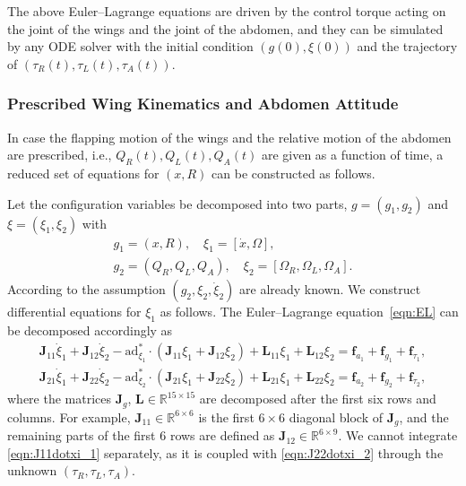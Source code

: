 \documentclass[10pt]{article}
\renewcommand{\Re}{\ensuremath{\mathbb{R}}}
\newcommand{\ad}{\ensuremath{\mathrm{ad}}}
\begin{document}
The above Euler--Lagrange equations are driven by the control torque acting on the joint of the wings and the joint of the abdomen, 
and they can be simulated by any ODE solver with the initial condition $(g(0),\xi(0))$ and the trajectory of $(\tau_R(t),\tau_L(t),\tau_A(t))$. 

\subsubsection{Prescribed Wing Kinematics and Abdomen Attitude}

In case the flapping motion of the wings and the relative motion of the abdomen are prescribed, i.e., $Q_R(t), Q_L(t), Q_A(t)$ are given as a function of time, a reduced set of equations for $(x,R)$ can be constructed as follows. 

Let the configuration variables be decomposed into two parts, $g=(g_1,g_2)$ and $\xi=(\xi_1,\xi_2)$ with
\begin{gather}
    g_1 = (x, R), \quad \xi_1 = [\dot x, \Omega], \label{eqn:g1xi1}\\
    g_2 = (Q_R, Q_L, Q_A), \quad \xi_2 = [\Omega_R, \Omega_L, \Omega_A].\label{eqn:g2xi2}
\end{gather}
According to the assumption $(g_2,\xi_2,\dot\xi_2)$ are already known. 
We construct differential equations for $\xi_1$ as follows. 
The Euler--Lagrange equation~\eqref{eqn:EL} can be decomposed accordingly as
\begin{align}
    \mathbf{J}_{11}\dot \xi_1 + \mathbf{J}_{12}\dot\xi_2 -\ad^*_{\xi_1}\cdot(\mathbf{J}_{11}\xi_1 + \mathbf{J}_{12}\xi_2) + \mathbf{L}_{11}\xi_1 + \mathbf{L}_{12}\xi_2 = \mathbf{f}_{a_1} + \mathbf{f}_{g_1} + \mathbf{f}_{\tau_1},\label{eqn:J11dotxi_1}\\
    \mathbf{J}_{21}\dot \xi_1 + \mathbf{J}_{22}\dot\xi_2 -\ad^*_{\xi_2}\cdot(\mathbf{J}_{21}\xi_1 + \mathbf{J}_{22}\xi_2) + \mathbf{L}_{21}\xi_1 + \mathbf{L}_{22}\xi_2 = \mathbf{f}_{a_2} + \mathbf{f}_{g_2} + \mathbf{f}_{\tau_2},\label{eqn:J22dotxi_2}
\end{align}
where the matrices $\mathbf{J}_g$, $\mathbf{L}\in\Re^{15\times 15}$ are decomposed after the first six rows and columns. 
For example, $\mathbf{J}_11\in\Re^{6\times 6}$ is the first $6\times 6$ diagonal block of $\mathbf{J}_g$, and the remaining parts of the first 6 rows are defined as $\mathbf{J}_{12}\in\Re^{6\times 9}$. 
We cannot integrate \eqref{eqn:J11dotxi_1} separately, as it is coupled with \eqref{eqn:J22dotxi_2} through the unknown $(\tau_R,\tau_L,\tau_A)$.
\end{document}
